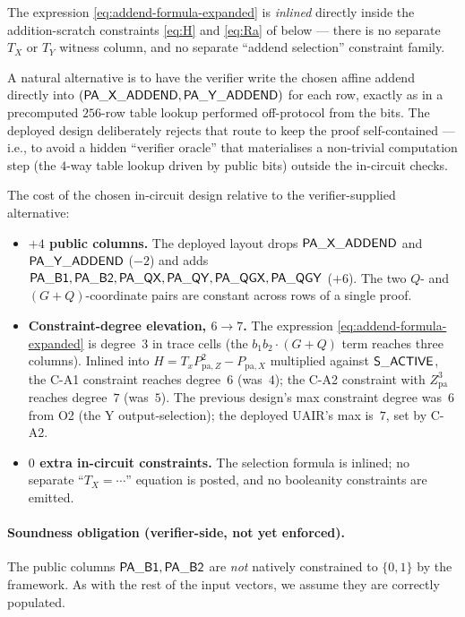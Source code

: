 The expression \eqref{eq:addend-formula-expanded} is \emph{inlined}
directly inside the addition-scratch constraints \eqref{eq:H} and
\eqref{eq:Ra} of  below — there is no separate
$T_X$ or $T_Y$ witness column, and no separate ``addend
selection'' constraint family.

\begin{remark}\label{rem:addend-cost}
A natural alternative is to have the verifier write the chosen
affine addend directly into $(\mathsf{PA\_X\_ADDEND}, \mathsf{PA\_Y\_ADDEND})$
for each row, exactly as in a precomputed $256$-row table lookup
performed off-protocol from the bits. The deployed design
deliberately rejects that route to keep the proof self-contained —
i.e., to avoid a hidden ``verifier oracle'' that materialises a
non-trivial computation step (the $4$-way table lookup driven by
public bits) outside the in-circuit checks.

The cost of the chosen in-circuit design relative to the
verifier-supplied alternative:
\begin{itemize}[leftmargin=2em]
  \item \textbf{$+4$ public columns.} The deployed layout drops
    $\mathsf{PA\_X\_ADDEND}$ and $\mathsf{PA\_Y\_ADDEND}$ ($-2$) and adds
    $\mathsf{PA\_B1}, \mathsf{PA\_B2}, \mathsf{PA\_QX}, \mathsf{PA\_QY},
    \mathsf{PA\_QGX}, \mathsf{PA\_QGY}$ ($+6$). The two $Q$- and
    $(G+Q)$-coordinate pairs are constant across rows of a single
    proof.
  \item \textbf{Constraint-degree elevation, $6 \to 7$.} The expression
    \eqref{eq:addend-formula-expanded} is degree~$3$ in trace cells
    (the $b_1 b_2 \cdot (G+Q)$ term reaches three columns). Inlined
    into $H = T_x P_{\mathrm{pa},Z}^2 - P_{\mathrm{pa},X}$ multiplied
    against $\mathsf{S\_ACTIVE}$, the C-A1 constraint reaches degree~$6$
    (was~$4$); the C-A2 constraint with $Z_{\mathrm{pa}}^3$ reaches
    degree~$7$ (was~$5$). The previous design's max constraint
    degree was~$6$ from O2 (the Y output-selection); the deployed
    UAIR's max is~$7$, set by C-A2.
  \item \textbf{$0$ extra in-circuit constraints.} The selection
    formula is inlined; no separate ``$T_X = \cdots$'' equation is
    posted, and no booleanity constraints are emitted.
\end{itemize}

\paragraph{Soundness obligation (verifier-side, not yet enforced).}
The  public columns $\mathsf{PA\_B1}, \mathsf{PA\_B2}$ are
\emph{not} natively constrained to $\{0,1\}$ by the framework.  As with the rest of the input vectors, we assume they are correctly populated. 
\end{remark}

